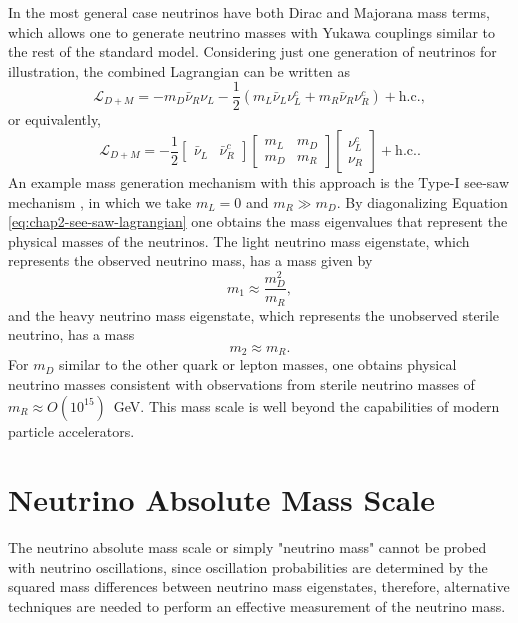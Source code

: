 In the most general case neutrinos have both Dirac and Majorana mass terms, which allows one to generate neutrino masses with Yukawa couplings similar to the rest of the standard model. Considering just one generation of neutrinos for illustration, the combined Lagrangian can be written as 
\begin{equation}
    \mathcal{L}_{D+M}=-m_D\bar{\nu}_{R}\nu_{L} - \frac{1}{2}(m_L\bar{\nu}_L\nu_L^c+m_R\bar{\nu}_R\nu_R^c)+\text{h.c.},
\end{equation}
or equivalently,
\begin{equation}
    \label{eq:chap2-see-saw-lagrangian}
    \mathcal{L}_{D+M}=-\frac{1}{2}\begin{bmatrix}\bar{\nu}_L&\bar{\nu}^c_R\end{bmatrix}\begin{bmatrix}m_L&m_D\\m_D&m_R\end{bmatrix}\begin{bmatrix}\nu^c_L\\ \nu_R\end{bmatrix} + \text{h.c.}.
\end{equation}
An example mass generation mechanism with this approach is the Type-I see-saw mechanism \cite{numass_models_seesaw}, in which we take $m_L=0$ and $m_R\gg m_D$. By diagonalizing Equation \ref{eq:chap2-see-saw-lagrangian} one obtains the mass eigenvalues that represent the physical masses of the neutrinos. The light neutrino mass eigenstate, which represents the observed neutrino mass, has a mass given by
\begin{equation}
    m_1\approx\frac{m_D^2}{m_R},
\end{equation}
and the heavy neutrino mass eigenstate, which represents the unobserved sterile neutrino, has a mass
\begin{equation}
    m_2\approx m_R.
\end{equation}
For $m_D$ similar to the other quark or lepton masses, one obtains physical neutrino masses consistent with observations from sterile neutrino masses of $m_R\approx O(10^{15})$~GeV. This mass scale is well beyond the capabilities of modern particle accelerators. 

\section{Neutrino Absolute Mass Scale}
\label{sec:chap2-nu-mass-scale}

The neutrino absolute mass scale or simply "neutrino mass" cannot be probed with neutrino oscillations, since oscillation probabilities are determined by the squared mass differences between neutrino mass eigenstates, therefore, alternative techniques are needed to perform an effective measurement of the neutrino mass.

